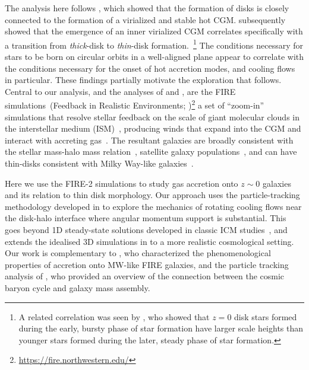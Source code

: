 \documentclass[fleqn,usenatbib]{mnras}
\begin{document}
The analysis here follows \cite{Stern2021}, which showed that the formation of disks is closely connected to the formation of a virialized and stable hot CGM.
\cite{Yu2021} subsequently showed that the emergence of an inner virialized CGM correlates specifically with a transition from {\em thick}-disk to {\em thin}-disk formation.~\footnote{ A related correlation was seen by \citealt{Ma2017a}, who showed that $z=0$ disk stars formed during the early, bursty phase of star formation have larger scale heights than younger stars formed during the later, steady phase of star formation.}
The conditions necessary for stars to be born on circular orbits in a well-aligned plane appear to correlate with the conditions necessary for the onset of hot accretion modes, and cooling flows in particular.
These findings partially motivate the exploration that follows.
Central to our analysis, and the analyses of \citeauthor{Stern2021} and \citeauthor{Yu2021}, are the FIRE simulations~(Feedback in Realistic Environments; \citealt{Hopkins2014, Hopkins2018})\footnote{\url{https://fire.northwestern.edu/}} a set of ``zoom-in'' simulations that resolve stellar feedback on the scale of giant molecular clouds in the interstellar medium (ISM)~\citep{Guszejnov2020b, Benincasa2020}, producing winds that expand into the CGM and interact with accreting gas~\citep{Muratov2015, Muratov2017, Angles-Alcazar2017, Hafen2019, Hafen2020, Pandya2021}.
The resultant galaxies are broadly consistent with the stellar mass-halo mass relation~\citep{Hopkins2017}, satellite galaxy populations~\citep{Wetzel2016, Garrison-Kimmel2019a, Samuel2020}, and can have thin-disks consistent with Milky Way-like galaxies~\citep{Ma2017a, Garrison-Kimmel2018, El-Badry2018, Sanderson2020, Yu2021}.

Here we use the FIRE-2 simulations to study gas accretion onto $z\sim0$ galaxies and its relation to thin disk morphology.
Our approach uses the particle-tracking methodology developed in \citet{Hafen2019, Hafen2020} to explore the mechanics of rotating cooling flows near the disk-halo interface where angular momentum support is substantial.
This goes beyond 1D steady-state solutions developed in classic ICM studies~\citep[e.g.][]{Cowie1980}, and extends the idealised 3D simulations in \cite{Stern2020} to a more realistic cosmological setting. 
Our work is complementary to \citet{Trapp2021}, who characterized the phenomenological properties of accretion onto MW-like FIRE galaxies, and the particle tracking analysis of \cite{Angles-Alcazar2017}, who provided an overview of the connection between the cosmic baryon cycle and galaxy mass assembly. 
\end{document}
